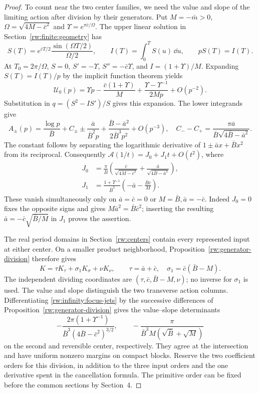 \begin{proof}
To count near the two center families, we need the value and slope
of the limiting action after division by their generators.
Put $M=-\bar m>0$, $\Omega=\sqrt{4M-\bar c^2}$ and
$\Upsilon=e^{\pi\bar c/\Omega}$. The upper linear solution in
Section~\ref{rw:finite:geometry} has
\[
 S(T)=e^{\bar cT/2}\frac{\sin(\Omega T/2)}{\Omega/2},\qquad
 I(T)=\int_0^TS(u)\,\dd u,\qquad pS(T)=I(T).
\]
At $T_0=2\pi/\Omega$, $S=0$, $S'=-\Upsilon$,
$S''=-\bar c\Upsilon$, and $I=(1+\Upsilon)/M$.
Expanding $S(T)=I(T)/p$ by the implicit function theorem yields
\begin{equation}\label{rw:infinity:upper-series}
 \mathcal U_0(p)=\Upsilon p-\frac{\bar c(1+\Upsilon)}M
          +\frac{\Upsilon-\Upsilon^{-1}}{2Mp}+O(p^{-2}).
\end{equation}
Substitution in $q=(S^2-IS')/S$ gives this expansion.
The lower integrands give
\[
 A_\pm(p)=\frac{\log p}{\bar B}+C_\pm
 \mathbin{\pm}\frac{\bar a}{\bar B^2p}
 +\frac{\bar B-\bar a^2}{2\bar B^3p^2}+O(p^{-3}),
 \quad C_--C_+=\frac{\pi\bar a}{\bar B\sqrt{4\bar B-\bar a^2}}.
\]
The constant follows by separating the logarithmic derivative of
$1\pm\bar ax+\bar Bx^2$ from its reciprocal. Consequently
$\mathcal A(1/t)=J_0+J_1t+O(t^2)$, where
\begin{equation}\label{rw:infinity:focus-jets}
\begin{aligned}
 J_0&=\frac\pi{\bar B}
 \left(\frac{\bar c}{\sqrt{4M-\bar c^2}}
       +\frac{\bar a}{\sqrt{4\bar B-\bar a^2}}\right),\\
 J_1&=\frac{1+\Upsilon^{-1}}{\bar B^2}
               \left(-\bar a-\frac{\bar B\bar c}M\right).
\end{aligned}
\end{equation}
These vanish simultaneously only on $\bar a=\bar c=0$ or
$M=\bar B,\bar a=-\bar c$. Indeed $J_0=0$ fixes the opposite
signs and gives $M\bar a^2=\bar B\bar c^2$; inserting the resulting
$\bar a=-\bar c\sqrt{\bar B/M}$ in $J_1$ proves the assertion.

The real period domains in Section~\ref{rw:centers} contain every
represented input at either center. On a smaller product neighborhood,
Proposition~\ref{rw:generator-division} therefore gives
\[
 K=\tau K_\tau+\sigma_1K_\sigma+\nu K_\nu,
 \qquad \tau=\bar a+\bar c,
 \quad \sigma_1=\bar c(\bar B-M).
\]
The independent dividing coordinates are
$(\tau,\bar c,\bar B-M,\nu)$; no inverse for $\sigma_1$ is used.
The value and slope distinguish the two transverse action columns.
Differentiating \eqref{rw:infinity:focus-jets} by the successive
differences of Proposition~\ref{rw:generator-division} gives the
value--slope determinants
\[
 -\frac{2\pi(1+\Upsilon^{-1})}
 {\bar B^3(4\bar B-\bar c^2)^{3/2}},\qquad
 -\frac{\pi}{\bar B^3M(\sqrt{\bar B}+\sqrt M)}
\]
on the second and reversible center, respectively. They agree at
the intersection and have uniform nonzero margins on compact blocks.
Reserve the two coefficient
orders for this division, in addition to the three input orders and
the one derivative spent in the cancellation formula. The primitive
order can be fixed before the common sections by Section~4.


\end{proof}
